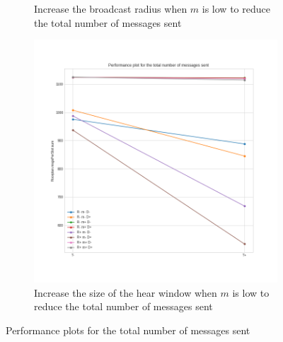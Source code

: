 \begin{figure}[hbt]
\begin{subfigure}[b]{0.33\textwidth}
		\caption{Increase the broadcast radius when \(m\) is low to
		reduce the total number of messages
		sent}\label{subfig:hdperfmessagesR}
	\end{subfigure}
	\begin{subfigure}[b]{0.32\textwidth}
		\centering
		\includegraphics[width=\textwidth]{img/hd/messages-T-perfplot}
		\caption{Increase the size of the hear window when \(m\) is low
		to reduce the total number of messages
		sent}\label{subfig:hdperfmessagesT}
	\end{subfigure}
	\caption{Performance plots for the total number of messages
	sent}\label{fig:hdperfmessages}
\end{figure}
